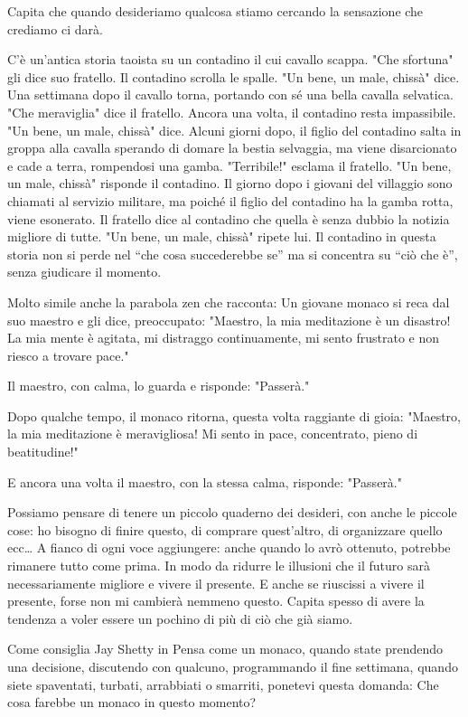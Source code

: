 \documentclass[12pt]{book} %
\begin{document}
\begin{mdframed}[linewidth=1pt]
Capita che quando desideriamo qualcosa stiamo cercando la sensazione che crediamo ci darà. 

C'è un'antica storia taoista su un contadino il cui cavallo scappa.
"Che sfortuna" gli dice suo fratello. Il contadino scrolla le spalle.
"Un bene, un male, chissà" dice. Una settimana dopo il cavallo torna,
portando con sé una bella cavalla selvatica. "Che meraviglia" dice il
fratello. Ancora una volta, il contadino resta impassibile. "Un bene, un male,
chissà" dice. Alcuni giorni dopo, il figlio del contadino salta in groppa alla cavalla sperando di
domare la bestia selvaggia, ma viene disarcionato e cade a terra, rompendosi una gamba.
"Terribile!" esclama il fratello. "Un bene, un male,
chissà" risponde il contadino. Il giorno dopo i giovani del villaggio sono chiamati al servizio
militare, ma poiché il figlio del contadino ha la gamba rotta, viene esonerato. Il fratello dice al contadino che
quella è senza dubbio la notizia migliore di tutte. "Un bene, un male,
chissà" ripete lui. Il contadino in questa storia non si perde nel “che cosa succederebbe se” ma
si concentra su “ciò che è”, senza giudicare il momento.

Molto simile anche la parabola zen che racconta:
Un giovane monaco si reca dal suo maestro e gli dice, preoccupato:
"Maestro, la mia meditazione è un disastro! La mia mente è agitata, mi distraggo continuamente, mi sento frustrato e non riesco a trovare pace."

Il maestro, con calma, lo guarda e risponde:
"Passerà."

Dopo qualche tempo, il monaco ritorna, questa volta raggiante di gioia:
"Maestro, la mia meditazione è meravigliosa! Mi sento in pace, concentrato, pieno di beatitudine!"

E ancora una volta il maestro, con la stessa calma, risponde:
"Passerà."


Possiamo pensare di tenere un piccolo quaderno dei desideri, con  anche le piccole cose:
ho bisogno di finire questo, di comprare quest'altro, di organizzare quello ecc…
A fianco di ogni voce aggiungere: anche quando lo avrò ottenuto, potrebbe rimanere tutto come prima.
In modo da ridurre le illusioni che il futuro sarà necessariamente migliore e vivere il presente.
E anche se riuscissi a vivere il presente, forse non mi cambierà nemmeno questo.
Capita spesso di avere la tendenza a voler essere un pochino di più di ciò che già siamo.

Come consiglia Jay Shetty in Pensa come un monaco, quando state prendendo una
decisione, discutendo con qualcuno, programmando il fine settimana, quando siete spaventati, turbati, arrabbiati o
smarriti, ponetevi questa domanda: Che cosa farebbe un monaco in questo momento? 


\end{mdframed}
\end{document}
